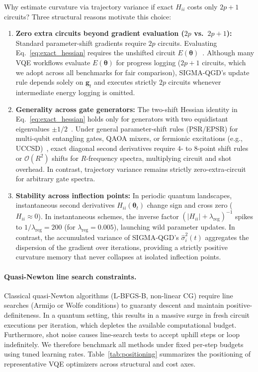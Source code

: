 \documentclass[11pt,a4paper]{article}
\begin{document}
Why estimate curvature via trajectory variance if exact $H_{ii}$ costs only $2p+1$ circuits? Three structural reasons motivate this choice:
\begin{enumerate}
    \item \textbf{Zero extra circuits beyond gradient evaluation ($2p$ vs.\ $2p+1$):} Standard parameter-shift gradients require $2p$ circuits. Evaluating Eq.~\eqref{eq:exact_hessian} requires the unshifted circuit $E(\boldsymbol{\theta})$~\cite{mari2021estimating,wierichs2022general}. Although many VQE workflows evaluate $E(\boldsymbol{\theta})$ for progress logging ($2p+1$ circuits, which we adopt across all benchmarks for fair comparison), SIGMA-QGD's update rule depends solely on $\mathbf{g}_t$ and executes strictly $2p$ circuits whenever intermediate energy logging is omitted.
    \item \textbf{Generality across gate generators:} The two-shift Hessian identity in Eq.~\eqref{eq:exact_hessian} holds only for generators with two equidistant eigenvalues $\pm 1/2$~\cite{mari2021estimating}. Under general parameter-shift rules (PSR/EPSR) for multi-qubit entangling gates, QAOA mixers, or fermionic excitations (e.g., UCCSD)~\cite{wierichs2022general}, exact diagonal second derivatives require $4$- to $8$-point shift rules or $\mathcal{O}(R^2)$ shifts for $R$-frequency spectra, multiplying circuit and shot overhead. In contrast, trajectory variance remains strictly zero-extra-circuit for arbitrary gate spectra.
    \item \textbf{Stability across inflection points:} In periodic quantum landscapes, instantaneous second derivatives $H_{ii}(\boldsymbol{\theta}_t)$ change sign and cross zero ($H_{ii} \approx 0$). In instantaneous schemes, the inverse factor $(|H_{ii}| + \lambda_{\text{reg}})^{-1}$ spikes to $1/\lambda_{\text{reg}} = 200$ (for $\lambda_{\text{reg}} = 0.005$), launching wild parameter updates. In contrast, the accumulated variance of SIGMA-QGD's $\hat{\sigma}_i^2(t)$ aggregates the dispersion of the gradient over iterations, providing a strictly positive curvature memory that never collapses at isolated inflection points.
\end{enumerate}

\paragraph{Quasi-Newton line search constraints.}
Classical quasi-Newton algorithms (L-BFGS-B, non-linear CG) require line searches (Armijo or Wolfe conditions) to guaranty descent and maintain positive-definiteness. In a quantum setting, this results in a massive surge in fresh circuit executions per iteration, which depletes the available computational budget.  Furthermore, shot noise causes line-search tests to accept uphill steps or loop indefinitely. We therefore benchmark all methods under fixed per-step budgets using tuned learning rates. Table~\ref{tab:positioning} summarizes the positioning of representative VQE optimizers across structural and cost axes.
\end{document}
